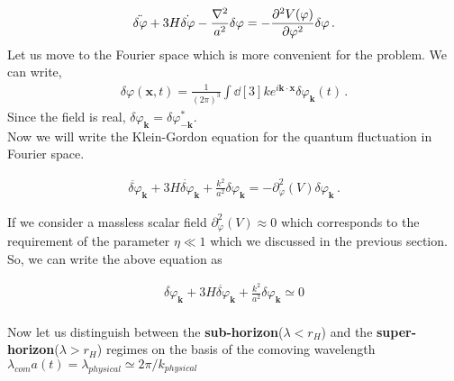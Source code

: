 \begin{align} 
    \ddot{ \delta \varphi} + 3 H \dot{\delta \varphi} - \frac{\nabla^2}{a^2} \delta \varphi = - \pdv[2]{V(\varphi )}{\varphi } \delta \varphi \,. \label{1.2.49}
\end{align}
Let us move to the Fourier space which is more convenient for the problem. We can write,
\begin{align}
    \delta \varphi (\mathbf{x}, t) = \frac{1}{(2\pi )^{3}} \int \dd[3]{k} 
    e^{i \mathbf{k} \cdot \mathbf{x}} \delta \varphi _{\mathbf{k}}(t)
    \,.\label{1.2.50}
\end{align}
Since the field is real, \(\delta \varphi _{\mathbf{k}} = \delta \varphi _{- \mathbf{k}}^{*}\).\\
Now we will write the Klein-Gordon equation for the quantum fluctuation in Fourier space.

\begin{align}
    \ddot{ \delta \varphi} _{\mathbf{k}} + 3 H \dot{ \delta \varphi}_{\mathbf{k}} + \frac{k^2}{a^2} \delta \varphi _{\mathbf{k}} = - \partial_{\varphi}^2(V) \delta \varphi _{\mathbf{k}}\,.\label{1.2.51}
\end{align}

If we consider a massless scalar field $\partial_{\varphi}^2(V) \approx 0$ which corresponds to the requirement of the parameter $\eta \ll 1$ which we discussed in the previous section. So, we can write the above equation as

\begin{align}
    \ddot{ \delta \varphi} _{\mathbf{k}} + 3 H \dot{ \delta \varphi}_{\mathbf{k}} + \frac{k^2}{a^2} \delta \varphi _{\mathbf{k}} \simeq 0 \label{1.2.52}
\end{align}\\

Now let us distinguish between the \textbf{sub-horizon}($\lambda < r_H$) and the \textbf{super-horizon}($\lambda > r_H$) regimes on the basis of the comoving wavelength $\lambda_{com} a(t) = \lambda_{physical} \simeq 2\pi/k_{physical}$


